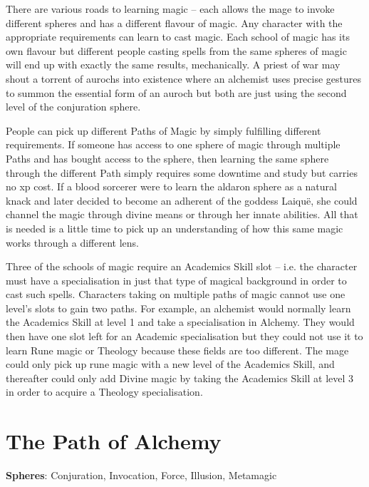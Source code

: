 \documentclass[titlepage,a4paper,openany]{book}
\begin{document}
\begin{multicols}{2}

There are various roads to learning magic -- each allows the mage to invoke different spheres and has a different flavour of magic. Any character with the appropriate requirements can learn to cast magic. Each school of magic has its own flavour but different people casting spells from the same spheres of magic will end up with exactly the same results, mechanically. A priest of war may shout a torrent of aurochs into existence where an alchemist uses precise gestures to summon the essential form of an auroch but both are just using the second level of the conjuration sphere.

People can pick up different Paths of Magic by simply fulfilling different requirements. If someone has access to one sphere of magic through multiple Paths and has bought access to the sphere, then learning the same sphere through the different Path simply requires some \gls{downtime} and study but carries no \gls{xp} cost. If a blood sorcerer were to learn the aldaron sphere as a natural knack and later decided to become an adherent of the goddess Laiqu\"{e}, she could channel the magic through divine means or through her innate abilities. All that is needed is a little time to pick up an understanding of how this same magic works through a different lens.

Three of the schools of magic require an Academics Skill slot -- i.e. the character must have a specialisation in just that type of magical background in order to cast such spells. Characters taking on multiple paths of magic cannot use one level's slots to gain two paths. For example, an alchemist would normally learn the Academics Skill at level 1 and take a specialisation in Alchemy. They would then have one slot left for an Academic specialisation but they could not use it to learn Rune magic or Theology because these fields are too different. The mage could only pick up rune magic with a new level of the Academics Skill, and thereafter could only add Divine magic by taking the Academics Skill at level 3 in order to acquire a Theology specialisation.

\end{multicols}

\section{The Path of Alchemy}

\textbf{Spheres}: Conjuration, Invocation, Force, Illusion, Metamagic
\end{document}
